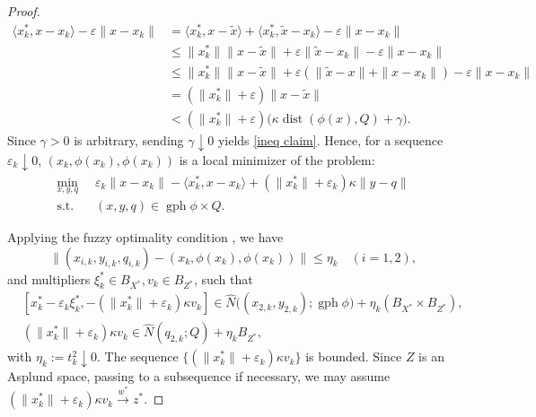 \documentclass[12pt,twoside,reqno]{amsart}
\theoremstyle{definition}
\numberwithin{equation}{section}
\begin{document}
\begin{proof}
\begin{align*}
    \langle x_k^*, x - x_k \rangle - \varepsilon \|x - x_k\|
    &= \langle x_k^*, x - \tilde{x} \rangle + \langle x_k^*, \tilde{x} - x_k \rangle - \varepsilon \|x - x_k\| \\
    &\leq \|x_k^*\| \|x - \tilde{x}\| + \varepsilon \|\tilde{x} - x_k\| - \varepsilon \|x - x_k\| \\
    &\leq \|x_k^*\| \|x - \tilde{x}\| + \varepsilon (\|\tilde{x} - x\| + \|x - x_k\|) - \varepsilon \|x - x_k\| \\
    &= (\|x_k^*\| + \varepsilon) \|x - \tilde{x}\| \\
    &< (\|x_k^*\| + \varepsilon) \big(\kappa \operatorname{dist}(\phi(x), Q) + \gamma\big).
\end{align*}
Since $\gamma > 0$ is arbitrary, sending $\gamma \downarrow 0$ yields \eqref{ineq claim}. 
Hence, for a sequence \( \varepsilon_k \downarrow 0 \), \( (x_k, \phi(x_k), \phi(x_k)) \) is a local minimizer of the problem: 
\begin{equation}\label{eq:aux_problem}
    \begin{aligned}
        \min_{x, y, q}\;\; & 
            \varepsilon_k \|x - x_k\| - \langle x_k^*, x - x_k \rangle 
            + (\|x_k^*\| + \varepsilon_k) \kappa \|y - q\| \\
        \text{s.t.}\;\; & (x, y, q) \in \operatorname{gph} \phi \times Q.
    \end{aligned}
\end{equation}

Applying the fuzzy optimality condition \cite[Lemma~2.32(ii)]{Mordukhovich2006variational}, we have 
\[
\|(x_{i,k}, y_{i,k}, q_{i,k}) - (x_k, \phi(x_k), \phi(x_k))\|\leq \eta_k \quad (i = 1, 2),
\]
and multipliers \( \xi_k^*\in B_{X^*}, v_k \in B_{Z^*} \), such that
\begin{equation}\label{eq:fuzzy_condition}
    \begin{aligned}
        &[x_k^* - \varepsilon_k \xi_k^*, -(\|x_k^*\| + \varepsilon_k)\kappa v_k] 
            \in \hat{N}\bigl((x_{2,k}, y_{2,k}); \operatorname{gph} \phi \bigr) + \eta_k (B_{X^*}\times B_{Z^*}), \\
        &(\|x_k^*\| + \varepsilon_k)\kappa v_k 
            \in \hat{N}(q_{2,k}; Q) + \eta_k B_{Z^*}, 
    \end{aligned}
\end{equation}
with \( \eta_k := t_k^2 \downarrow 0 \). 
The sequence \( \{(\|x_k^*\| + \varepsilon_k)\kappa v_k\} \) is bounded. Since \( Z \) is an Asplund space, passing to a subsequence if necessary, we may assume $(\|x_k^*\| + \varepsilon_k)\kappa v_k \xrightarrow{w^*} z^*$. 


\end{proof}
\end{document}
